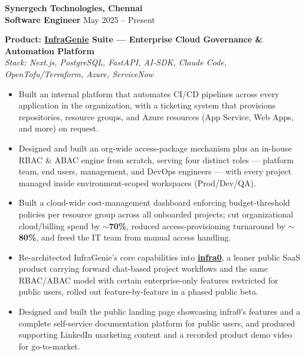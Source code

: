 \documentclass[a4paper,10.5pt]{article}
\begin{document}
\noindent\textbf{Synergech Technologies, Chennai}\\
\textbf{Software Engineer} \hfill May 2025 -- Present

\vspace{6pt}
\noindent\textbf{Product: \href{https://infragenie.synergech.com/auth/sign-in}{InfraGenie} Suite --- Enterprise Cloud Governance \& Automation Platform}\\
\textit{Stack: Next.js, PostgreSQL, FastAPI, AI-SDK, Claude Code, OpenTofu/Terraform, Azure, ServiceNow}
\begin{itemize}
\item Built an internal platform that automates CI/CD pipelines across every application in the organization, with a ticketing system that provisions repositories, resource groups, and Azure resources (App Service, Web Apps, and more) on request.
\item Designed and built an org-wide access-package mechanism plus an in-house RBAC \& ABAC engine from scratch, serving four distinct roles --- platform team, end users, management, and DevOps engineers --- with every project managed inside environment-scoped workspaces (Prod/Dev/QA).
\item Built a cloud-wide cost-management dashboard enforcing budget-threshold policies per resource group across all onboarded projects; cut organizational cloud/billing spend by \textbf{$\sim$70\%}, reduced access-provisioning turnaround by \textbf{$\sim$80\%}, and freed the IT team from manual access handling.
\item Re-architected InfraGenie's core capabilities into \href{https://infra0.ai/}{\textbf{infra0}}, a leaner public SaaS product carrying forward chat-based project workflows and the same RBAC/ABAC model with certain enterprise-only features restricted for public users, rolled out feature-by-feature in a phased public beta.
\item Designed and built the public landing page showcasing infra0's features and a complete self-service documentation platform for public users, and produced supporting LinkedIn marketing content and a recorded product demo video for go-to-market.
\end{itemize}
\end{document}
